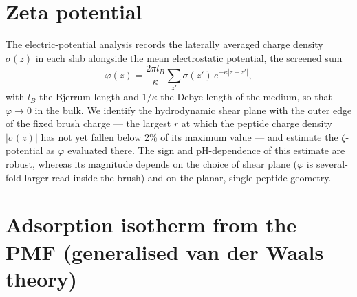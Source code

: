 \documentclass[11pt]{article}
\begin{document}
\section{Zeta potential}

The electric-potential analysis records the laterally averaged charge density
$\sigma(z)$ in each slab alongside the mean electrostatic potential, the
screened sum
\begin{equation}\label{eq:phi}
\varphi(z) = \frac{2\pi l_B}{\kappa}\sum_{z'}\sigma(z')\,e^{-\kappa|z-z'|},
\end{equation}
with $l_B$ the Bjerrum length and $1/\kappa$ the Debye length of the medium, so
that $\varphi\to0$ in the bulk.  We identify the hydrodynamic shear plane with
the outer edge of the fixed brush charge --- the largest $r$ at which the
peptide charge density $|\sigma(z)|$ has not yet fallen below 2\% of its
maximum value --- and estimate the $\zeta$-potential as $\varphi$ evaluated
there.  The sign and
pH-dependence of this estimate are robust, whereas its magnitude depends on the
choice of shear plane ($\varphi$ is several-fold larger read inside the brush)
and on the planar, single-peptide geometry.

\section{Adsorption isotherm from the PMF (generalised van der Waals theory)}
\end{document}
